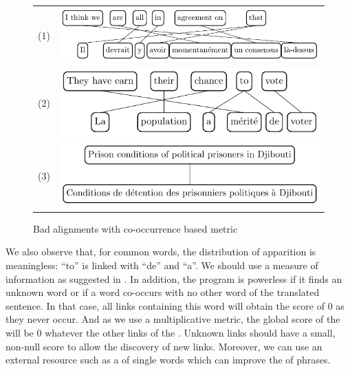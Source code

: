 \documentclass[output=paper,modfonts,nonflat]{langsci/langscibook}
\begin{document}
\begin{figure}
\centering
\begin{tabular}{lC}
(1) & \includegraphics[scale=.9]{figures/figSemmar4} \\[1ex]
(2) & \includegraphics[scale=.9]{figures/figSemmar5} \\[1ex]
(3) & \includegraphics[scale=.9]{figures/figSemmar6} \\
\end{tabular}
\caption{\label{sem:fig:badali}Bad alignments with co-occurrence based metric}
\end{figure}

We also observe that, for common words, the distribution of apparition is meaningless: ``to'' is linked with ``de'' and ``a''. 
We should use a measure of information as suggested in \citet{gao1998automatic}.
In addition, the program is powerless if it finds an unknown word or if a word co-occurs with no other word of the translated sentence. 
In that case, all links containing this word will obtain the score of 0 as they never occur. 
And as we use a multiplicative metric, the global score of the  will be 0 whatever the other links of the . Unknown links should have a small, non-null score to allow the discovery of new links. 
Moreover, we can use an external resource such as a  of single words which can improve the  of phrases.
\end{document}
